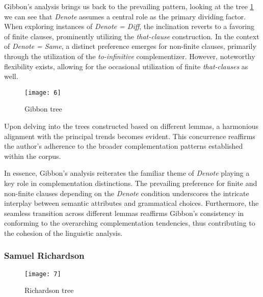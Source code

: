 \documentclass[final]{clv3} %
\begin{document}
Gibbon's analysis brings us back to the prevailing pattern, looking at the tree \cref{fig:8} we can see that \textit{\textit{Denote}} assumes a central role as the primary dividing factor. When exploring instances of \textit{\textit{Denote} = Diff}, the inclination reverts to a favoring of finite clauses, prominently utilizing the \textit{that-clause} construction. In the context of \textit{\textit{Denote} = Same}, a distinct preference emerges for non-finite clauses, primarily through the utilization of the \textit{\textit{to-infinitive}} complementizer. However, noteworthy flexibility exists, allowing for the occasional utilization of finite \textit{\textit{that-clause}s} as well.

\begin{figure}[htpb]
    \centering
    \texttt{[image: 6]}
    \caption{Gibbon tree}
    \label{fig:8}
\end{figure}

Upon delving into the trees constructed based on different lemmas, a harmonious alignment with the principal trends becomes evident. This concurrence reaffirms the author's adherence to the broader complementation patterns established within the corpus.

In essence, Gibbon's analysis reiterates the familiar theme of \textit{\textit{Denote}} playing a key role in complementation distinctions. The prevailing preference for finite and non-finite clauses depending on the \textit{\textit{Denote}} condition underscores the intricate interplay between semantic attributes and grammatical choices. Furthermore, the seamless transition across different lemmas reaffirms Gibbon's consistency in conforming to the overarching complementation tendencies, thus contributing to the cohesion of the linguistic analysis.

\subsubsection{Samuel Richardson}

\begin{figure}[htpb]
    \centering
    \texttt{[image: 7]}
    \caption{Richardson tree}
    \label{fig:9}
\end{figure}
\end{document}
